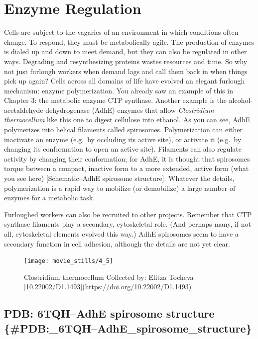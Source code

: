 \documentclass[]{tufte-book}
\begin{document}
\section{Enzyme Regulation}\label{enzyme-regulation}

Cells are subject to the vagaries of an environment in which conditions
often change. To respond, they must be metabolically agile. The
production of enzymes is dialed up and down to meet demand, but they can
also be regulated in other ways. Degrading and resynthesizing proteins
wastes resources and time. So why not just furlough workers when demand
lags and call them back in when things pick up again? Cells across all
domains of life have evolved an elegant furlough mechanism: enzyme
polymerization. You already saw an example of this in Chapter 3: the
metabolic enzyme CTP synthase. Another example is the
alcohol-acetaldehyde dehydrogenase (AdhE) enzymes that allow
\emph{Clostridium thermocellum} like this one to digest cellulose into
ethanol. As you can see, AdhE polymerizes into helical filaments called
spirosomes. Polymerization can either inactivate an enzyme (e.g.~by
occluding its active site), or activate it (e.g.~by changing its
conformation to open an active site). Filaments can also regulate
activity by changing their conformation; for AdhE, it is thought that
spirosomes torque between a compact, inactive form to a more extended,
active form (what you see here) {[}Schematic--AdhE spirosome
structure{]}. Whatever the details, polymerization is a rapid way to
mobilize (or demobilize) a large number of enzymes for a metabolic task.

Furloughed workers can also be recruited to other projects. Remember
that CTP synthase filaments play a secondary, cytoskeletal role. (And
perhaps many, if not all, cytoskeletal elements evolved this way.) AdhE
spirosomes seem to have a secondary function in cell adhesion, although
the details are not yet clear.

\begin{figure}
\texttt{[image: movie\_stills/4\_5]} \caption[Clostridium thermocellum Collected by]{Clostridium thermocellum Collected by: Elitza Tocheva [10.22002/D1.1493](https://doi.org/10.22002/D1.1493)}\label{fig:unnamed-chunk-65}
\end{figure}

\subsection{PDB: 6TQH--AdhE spirosome structure
\{\#PDB:\_6TQH--AdhE\_spirosome\_structure\}}\label{pdb-6tqhadhe-spirosome-structure-pdb_6tqhadhe_spirosome_structure}
\end{document}
